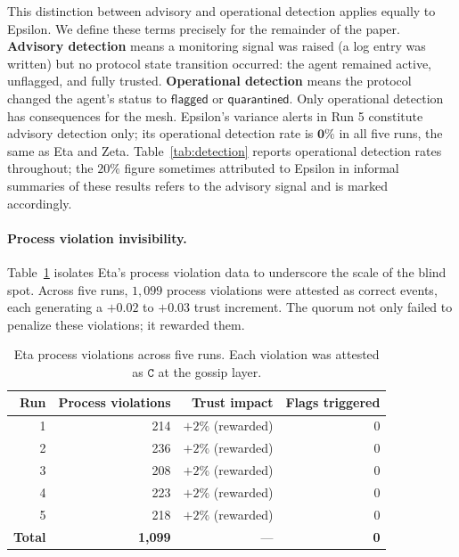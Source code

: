 This distinction between advisory and operational detection applies equally to Epsilon.
We define these terms precisely for the remainder of the paper.  \textbf{Advisory
detection} means a monitoring signal was raised (a log entry was written) but no protocol
state transition occurred: the agent remained active, unflagged, and fully trusted.
\textbf{Operational detection} means the protocol changed the agent's status to
$\mathsf{flagged}$ or $\mathsf{quarantined}$.  Only operational detection has
consequences for the mesh.  Epsilon's variance alerts in Run 5 constitute advisory
detection only; its operational detection rate is $\mathbf{0\%}$ in all five runs, the
same as Eta and Zeta.  Table~\ref{tab:detection} reports operational detection rates
throughout; the $20\%$ figure sometimes attributed to Epsilon in informal summaries of
these results refers to the advisory signal and is marked accordingly.

\paragraph{Process violation invisibility.}
Table~\ref{tab:eta_violations} isolates Eta's process violation data to underscore the
scale of the blind spot.  Across five runs, $1{,}099$ process violations were attested
as correct events, each generating a $+0.02$ to $+0.03$ trust increment.  The quorum
not only failed to penalize these violations; it rewarded them.

\begin{table}[h]
\centering
\caption{Eta process violations across five runs.
         Each violation was attested as $\mathtt{C}$ at the gossip layer.}
\label{tab:eta_violations}
\begin{tabular}{rrrr}
\hline
\textbf{Run} & \textbf{Process violations} & \textbf{Trust impact} & \textbf{Flags triggered} \\
\hline
1 & 214 & $+2\%$ (rewarded) & 0 \\
2 & 236 & $+2\%$ (rewarded) & 0 \\
3 & 208 & $+2\%$ (rewarded) & 0 \\
4 & 223 & $+2\%$ (rewarded) & 0 \\
5 & 218 & $+2\%$ (rewarded) & 0 \\
\hline
\textbf{Total} & \textbf{1{,}099} & --- & \textbf{0} \\
\hline
\end{tabular}
\end{table}

